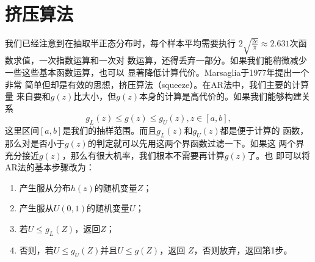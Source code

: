 \section{挤压算法}

我们已经注意到在抽取半正态分布时，每个样本平均需要执行
$2\sqrt{\frac{2e}{\pi}} \approx 2.631$次函数求值，一次指数运算和一次对
数运算，还得丢弃一部分。如果我们能稍微减少一些这些基本函数运算，也可以
显著降低计算代价。Marsaglia于1977年\cite{Marsaglia1977The}提出一个非常
简单但却是有效的思想，挤压算法（squeeze）。在AR法中，我们主要的计算量
来自要和$g(z)$比大小，但$g(z)$本身的计算是高代价的。如果我们能够构建关
系
\begin{equation}
  g_L(z) \leq g(z) \leq g_U(z), z \in [a, b],
\label{eq::squeeze}
\end{equation}
这里区间$[a, b]$是我们的抽样范围。而且$g_L(z)$和$g_U(z)$都是便于计算的
函数，那么对是否小于$g(z)$的判定就可以先用这两个界函数过滤一下。如果这
两个界充分接近$g(z)$，那么有很大机率，我们根本不需要再计算$g(z)$了。也
即可以将AR法的基本步骤改为：
\begin{enumerate}
\item 产生服从分布$h(z)$的随机变量$Z$；
\item 产生服从$U(0, 1)$的随机变量$U$；
\item 若$U \leq g_L(Z)$，返回$Z$；
\item 否则，若$U \leq g_U(Z)$并且$U \leq g(Z)$，返回
  $Z$，否则放弃，返回第1步。
\end{enumerate}

